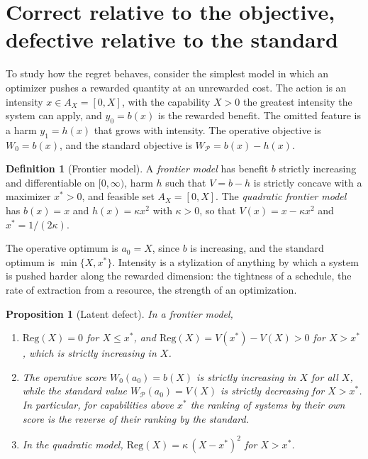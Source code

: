 \documentclass[11pt]{article}
\newcommand{\Reg}{\mathrm{Reg}}
\theoremstyle{plain}
\newtheorem{proposition}{Proposition}
\theoremstyle{definition}
\newtheorem{definition}{Definition}
\begin{document}
\section{Correct relative to the objective, defective relative to the standard}\label{sec:latent}

To study how the regret behaves, consider the simplest model in which an optimizer pushes a rewarded quantity at an unrewarded cost. The action is an intensity $x\in A_X=[0,X]$, with the capability $X>0$ the greatest intensity the system can apply, and $y_0=b(x)$ is the rewarded benefit. The omitted feature is a harm $y_1=h(x)$ that grows with intensity. The operative objective is $W_0=b(x)$, and the standard objective is $W_{\mathcal P}=b(x)-h(x)$.

\begin{definition}[Frontier model]\label{def:frontier}
A \emph{frontier model} has benefit $b$ strictly increasing and differentiable on $[0,\infty)$, harm $h$ such that $V=b-h$ is strictly concave with a maximizer $x^*>0$, and feasible set $A_X=[0,X]$. The \emph{quadratic frontier model} has $b(x)=x$ and $h(x)=\kappa x^2$ with $\kappa>0$, so that $V(x)=x-\kappa x^2$ and $x^*=1/(2\kappa)$.
\end{definition}

The operative optimum is $a_0=X$, since $b$ is increasing, and the standard optimum is $\min\{X,x^*\}$. Intensity is a stylization of anything by which a system is pushed harder along the rewarded dimension: the tightness of a schedule, the rate of extraction from a resource, the strength of an optimization.

\begin{proposition}[Latent defect]\label{prop:latent}
In a frontier model,
\begin{enumerate}[label=(\roman*),nosep]
\item $\Reg(X)=0$ for $X\le x^*$, and $\Reg(X)=V(x^*)-V(X)>0$ for $X>x^*$, which is strictly increasing in $X$.
\item The operative score $W_0(a_0)=b(X)$ is strictly increasing in $X$ for all $X$, while the standard value $W_{\mathcal P}(a_0)=V(X)$ is strictly decreasing for $X>x^*$. In particular, for capabilities above $x^*$ the ranking of systems by their own score is the reverse of their ranking by the standard.
\item In the quadratic model, $\Reg(X)=\kappa\,(X-x^*)^2$ for $X>x^*$.
\end{enumerate}
\end{proposition}
\end{document}
